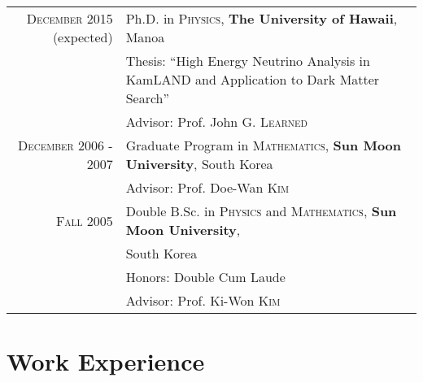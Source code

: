 \documentclass[a4paper,10pt]{article} %
\begin{document}
\begin{tabular}{rp{11cm}}	
	\textsc{December} 2015 (expected) & Ph.D. in \textsc{Physics}, \textbf{The
University of Hawaii}, Manoa\\
	& Thesis: ``High Energy Neutrino Analysis in KamLAND and Application to Dark
Matter Search''\\
	& \small Advisor: Prof. John G. \textsc{Learned}\\


	\textsc{December} 2006 - 2007 & Graduate Program in
	\textsc{}\textsc{Mathematics}, \normalsize\textbf{Sun Moon University},
	South Korea\\
	& \small Advisor: Prof. Doe-Wan \textsc{Kim}\\


	\textsc{Fall} 2005 & Double B.Sc. in \textsc{Physics} and
	\textsc{Mathematics}, \textbf{Sun Moon University},\\
	& South Korea\\
	& \small Honors: Double Cum Laude\\
	& \small Advisor: Prof. Ki-Won \textsc{Kim}\\


\end{tabular}


\section{Work Experience}
\end{document}
